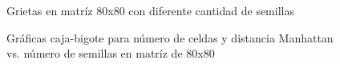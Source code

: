 \documentclass{article}
\begin{document}
\begin{figure}[htbp]
\centering
{}
\caption{Grietas en matríz 80x80 con diferente cantidad de semillas} \label{figura 6}
\end{figure}

\begin{figure}[htbp]
\centering
{}
\caption{Gráficas caja-bigote para número de celdas y distancia Manhattan vs. número de semillas en matríz de 80x80} \label{figura 3}
\end{figure}
\end{document}
